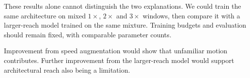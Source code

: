 These results alone cannot distinguish the two explanations. We could train the same architecture on mixed $1\times$, $2\times$ and $3\times$ windows, then compare it with a larger-reach model trained on the same mixture. Training budgets and evaluation should remain fixed, with comparable parameter counts.

Improvement from speed augmentation would show that unfamiliar motion contributes. Further improvement from the larger-reach model would support architectural reach also being a limitation.
